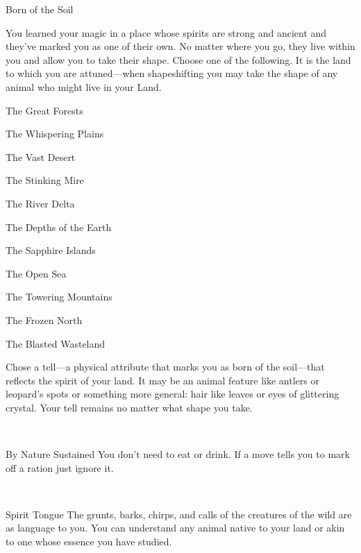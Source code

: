 \documentclass[8pt]{extarticle}
\begin{document}
\begin{minipage}[t]{4.6in}

\begin{basicmove}{Born of the Soil}

  You learned your magic in a place whose spirits are strong and
  ancient and they’ve marked you as one of their own. No matter where
  you go, they live within you and allow you to take their
  shape. Choose one of the following. It is the land to which you are
  attuned—when shapeshifting you may take the shape of any animal who
  might live in your Land.

\begin{multicols}{2}
  \begin{choices}
  \item The Great Forests
  \item The Whispering Plains
  \item The Vast Desert
  \item The Stinking Mire
  \item The River Delta
  \item The Depths of the Earth
  \end{choices}
  \columnbreak
  \begin{choices}
  \item The Sapphire Islands
  \item The Open Sea
  \item The Towering Mountains
  \item The Frozen North
  \item The Blasted Wasteland
  \end{choices}
\end{multicols}

    Chose a tell—a physical attribute that marks you as born of the
    soil—that reflects the spirit of your land. It may be an animal
    feature like antlers or leopard’s spots or something more general:
    hair like leaves or eyes of glittering crystal. Your tell remains
    no matter what shape you take.
\end{basicmove}
\

\begin{basicmove}{By Nature Sustained}
  You don’t need to eat or drink. If a move tells you to mark off a
  ration just ignore it.
\end{basicmove}
\

\begin{basicmove}{Spirit Tongue}
  The grunts, barks, chirps, and calls of the creatures of the wild
  are as language to you. You can understand any animal native to your
  land or akin to one whose essence you have studied.
\end{basicmove}
\


\end{minipage}
\end{document}
